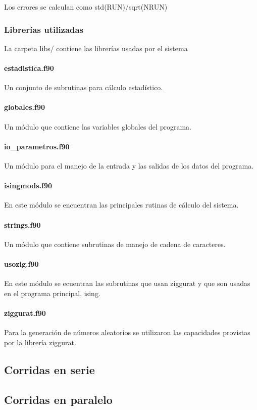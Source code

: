   Los errores se calculan como std(RUN)/sqrt(NRUN)


\subsubsection{Librer\'ias utilizadas}

La carpeta libs/ contiene las librer\'ias usadas por el sistema

\paragraph{estadistica.f90}

Un conjunto de subrutinas para c\'alculo estad\'istico. 

\paragraph{globales.f90}
Un m\'odulo que contiene las variables globales del programa.
	
\paragraph{io\_parametros.f90}  
Un m\'odulo para el manejo de la entrada y las salidas de los
datos del programa.


\paragraph{isingmods.f90} 
En este m\'odulo  se encuentran las principales rutinas de c\'alculo del
sistema.


\paragraph{strings.f90}
Un m\'odulo que contiene subrutinas de manejo de cadena de caracteres.


\paragraph{usozig.f90} 
En este m\'odulo se ecuentran las subrutinas que usan ziggurat y que
son usadas en el programa principal, ising.
					
					
\paragraph{ziggurat.f90}

Para la generaci\'on de n\'umeros aleatorios se utilizaron
las capacidades provistas por la librer\'ia ziggurat. 



\subsection{Corridas en serie}\label{serie}

\subsection{Corridas en paralelo}\label{paralelo}
